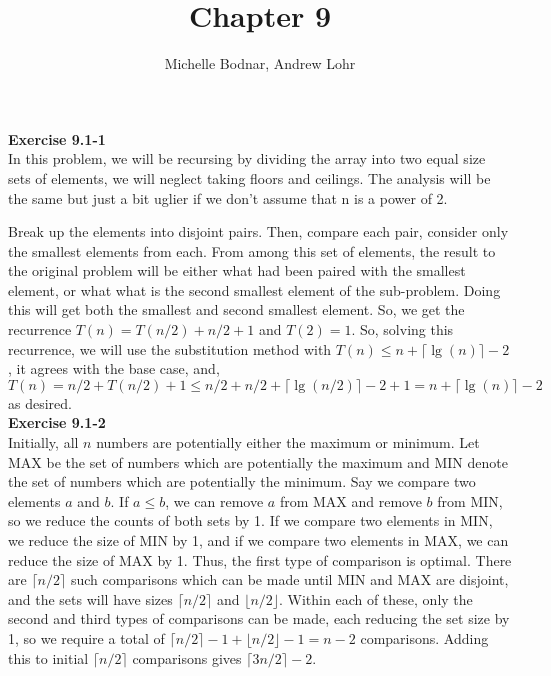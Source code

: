 \documentclass{article}
\title{Chapter 9}
\author{Michelle Bodnar, Andrew Lohr}
\begin{document}
\maketitle

\noindent\textbf{ Exercise 9.1-1} \\

In this problem, we will be recursing by dividing the array into two equal size sets of elements, we will neglect taking floors and ceilings. The analysis will be the same but just a bit uglier if we don't assume that n is a power of 2.

Break up the elements into disjoint pairs. Then, compare each pair, consider only the smallest elements from each. From among this set of elements, the result to the original problem will be either what had been paired with the smallest element, or what what is the second smallest element of the sub-problem. Doing this will get both the smallest and second smallest element. So, we get the recurrence $T(n)  = T(n/2) + n/2 + 1$ and $T(2)= 1$. So, solving this recurrence, we will use the substitution method with $T(n) \le n + \lceil \lg(n) \rceil -2$, it agrees with the base case, and, $T(n) = n/2 + T(n/2) +1 \le n/2 + n/2 + \lceil\lg(n/2)\rceil -2 +1 =  n + \lceil \lg(n) \rceil -2$ as desired.\\


\noindent\textbf{Exercise 9.1-2}\\

Initially, all $n$ numbers are potentially either the maximum or minimum.  Let MAX be the set of numbers which are potentially the maximum and MIN denote the set of numbers which are potentially the minimum.  Say we compare two elements $a$ and $b$.  If $a \leq b$, we can remove $a$ from MAX and remove $b$ from MIN, so we reduce the counts of both sets by 1.  If we compare two elements in MIN, we reduce the size of MIN by 1, and if we compare two elements in MAX, we can reduce the size of MAX by 1.  Thus, the first type of comparison is optimal.  There are $\lceil n/2 \rceil$ such comparisons which can be made until MIN and MAX are disjoint, and the sets will have sizes $\lceil n/2 \rceil$ and $\lfloor n/2 \rfloor$.  Within each of these, only the second and third types of comparisons can be made, each reducing the set size by 1, so we require a total of $\lceil n/2 \rceil - 1 + \lfloor n/2 \rfloor - 1 = n-2$ comparisons.  Adding this to initial $\lceil n/2 \rceil$ comparisons gives $\lceil 3n/2 \rceil - 2$. \\
\end{document}
